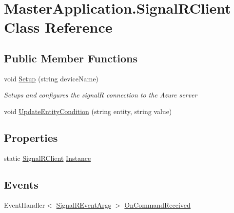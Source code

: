 \hypertarget{class_master_application_1_1_signal_r_client}{}\section{Master\+Application.\+Signal\+R\+Client Class Reference}
\label{class_master_application_1_1_signal_r_client}
\subsection*{Public Member Functions}
\begin{DoxyCompactItemize}
\item 
void \mbox{\hyperlink{class_master_application_1_1_signal_r_client_a510d16bef7f5c25be0b4bd6e2927df73}{Setup}} (string device\+Name)
\begin{DoxyCompactList}\small\item\em Setups and configures the signalR connection to the Azure server \end{DoxyCompactList}\item 
void \mbox{\hyperlink{class_master_application_1_1_signal_r_client_a3410b2f911461baa15c0e66e9554fdd4}{Update\+Entity\+Condition}} (string entity, string value)
\end{DoxyCompactItemize}
\subsection*{Properties}
\begin{DoxyCompactItemize}
\item 
static \mbox{\hyperlink{class_master_application_1_1_signal_r_client}{Signal\+R\+Client}} \mbox{\hyperlink{class_master_application_1_1_signal_r_client_a6fe29cdd3dbddd9a0fd08d0d697d6a13}{Instance}}
\end{DoxyCompactItemize}
\subsection*{Events}
\begin{DoxyCompactItemize}
\item 
Event\+Handler$<$ \mbox{\hyperlink{class_master_application_1_1_signal_r_event_args}{Signal\+R\+Event\+Args}} $>$ \mbox{\hyperlink{class_master_application_1_1_signal_r_client_a96f1903916cbf1732ceebebbc086b10b}{On\+Command\+Received}}
\end{DoxyCompactItemize}
